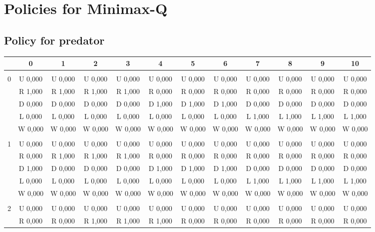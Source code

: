 \clearpage
\appendix
\appendixpage

\section{Policies for Minimax-Q} \label{app:policiesM}
\subsection{Policy for predator}
\begin{table}[htbp]
\label{policyLabelPred}
\centering
\begin{tiny}
\begin{tabular}{c|c|c|c|c|c|c|c|c|c|c|c|}
&0&1&2&3&4&5&6&7&8&9&10\\ \hline\\
0&U 0,000&U 0,000&U 0,000&U 0,000&U 0,000&U 0,000&U 0,000&U 0,000&U 0,000&U 0,000&U 0,000\\
&R 1,000&R 1,000&R 1,000&R 1,000&R 0,000&R 0,000&R 0,000&R 0,000&R 0,000&R 0,000&R 0,000\\
&D 0,000&D 0,000&D 0,000&D 0,000&D 1,000&D 1,000&D 1,000&D 0,000&D 0,000&D 0,000&D 0,000\\
&L 0,000&L 0,000&L 0,000&L 0,000&L 0,000&L 0,000&L 0,000&L 1,000&L 1,000&L 1,000&L 1,000\\
&W 0,000&W 0,000&W 0,000&W 0,000&W 0,000&W 0,000&W 0,000&W 0,000&W 0,000&W 0,000&W 0,000\\
\hline \\
1&U 0,000&U 0,000&U 0,000&U 0,000&U 0,000&U 0,000&U 0,000&U 0,000&U 0,000&U 0,000&U 0,000\\
&R 0,000&R 1,000&R 1,000&R 1,000&R 0,000&R 0,000&R 0,000&R 0,000&R 0,000&R 0,000&R 0,000\\
&D 1,000&D 0,000&D 0,000&D 0,000&D 1,000&D 1,000&D 1,000&D 0,000&D 0,000&D 0,000&D 0,000\\
&L 0,000&L 0,000&L 0,000&L 0,000&L 0,000&L 0,000&L 0,000&L 1,000&L 1,000&L 1,000&L 1,000\\
&W 0,000&W 0,000&W 0,000&W 0,000&W 0,000&W 0,000&W 0,000&W 0,000&W 0,000&W 0,000&W 0,000\\
\hline \\
2&U 0,000&U 0,000&U 0,000&U 0,000&U 0,000&U 0,000&U 0,000&U 0,000&U 0,000&U 0,000&U 0,000\\
&R 0,000&R 0,000&R 1,000&R 1,000&R 1,000&R 0,000&R 0,000&R 0,000&R 0,000&R 0,000&R 0,000\\

\end{tabular}
\end{tiny}
\end{table}
